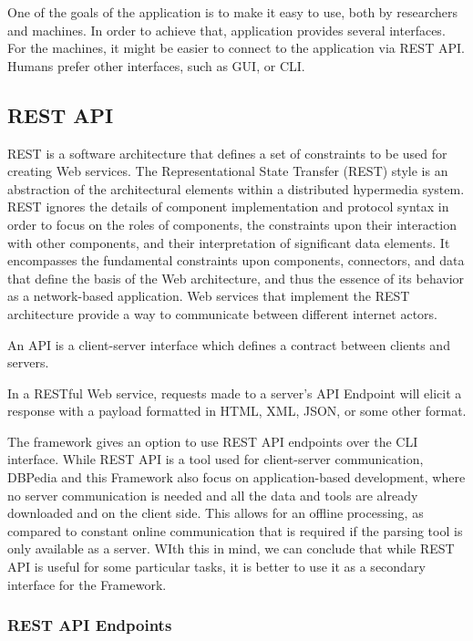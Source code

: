 \documentclass[thesis=M,english,hidelinks]{FITthesis}[2019/12/23]
\begin{document}
One of the goals of the application is to make it easy to use, both by researchers and machines. In order to achieve that, application provides several interfaces. For the machines, it might be easier to connect to the application via \gls{REST} \gls{API}. Humans prefer other interfaces, such as \gls{GUI}, or \gls{CLI}.

\subsection{REST API}

\gls{REST} is a software architecture that defines a set of constraints to be used for creating Web services. The Representational State Transfer (REST) style is an abstraction of the architectural elements within a distributed hypermedia system. REST ignores the details of component implementation and protocol syntax in order to focus on the roles of components, the constraints upon their interaction with other components, and their interpretation of significant data elements. It encompasses the fundamental constraints upon components, connectors, and data that define the basis of the Web architecture, and thus the essence of its behavior as a network-based application\cite{rest_proposal}. Web services that implement the REST architecture provide a way to communicate between different internet actors.

An \gls{API} is a client-server interface which defines a contract between clients and servers.

In a RESTful Web service, requests made to a server's API Endpoint will elicit a response with a payload formatted in HTML, XML, JSON, or some other format.

The framework gives an option to use REST API endpoints over the CLI interface. While REST API is a tool used for client-server communication, DBPedia and this Framework also focus on application-based development, where no server communication is needed and all the data and tools are already downloaded and on the client side. This allows for an offline processing, as compared to constant online communication that is required if the parsing tool is only available as a server. WIth this in mind, we can conclude that while \gls{REST} \gls{API} is useful for some particular tasks, it is better to use it as a secondary interface for the Framework.

\subsubsection{REST API Endpoints}
\end{document}
